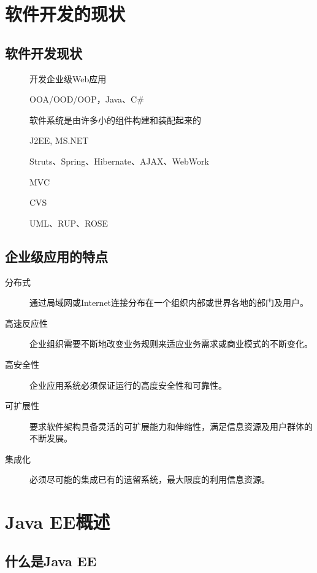 \section{软件开发的现状}
\subsection{软件开发现状}

\begin{description}
\item[] 开发企业级Web应用
\item[] OOA/OOD/OOP，Java、C\#
\item[] 软件系统是由许多小的组件构建和装配起来的
\item[] J2EE, MS.NET
\item[] Struts、Spring、Hibernate、AJAX、WebWork
\item[] MVC
\item[] CVS
\item[] UML、RUP、ROSE
\end{description}

\subsection{企业级应用的特点}

\begin{description}
\item[分布式] 通过局域网或Internet连接分布在一个组织内部或世界各地的部门及用户。
\item[高速反应性] 企业组织需要不断地改变业务规则来适应业务需求或商业模式的不断变化。
\item[高安全性] 企业应用系统必须保证运行的高度安全性和可靠性。
\item[可扩展性] 要求软件架构具备灵活的可扩展能力和伸缩性，满足信息资源及用户群体的不断发展。
\item[集成化] 必须尽可能的集成已有的遗留系统，最大限度的利用信息资源。
\end{description}

\section{Java EE概述}


\subsection{什么是Java EE}

